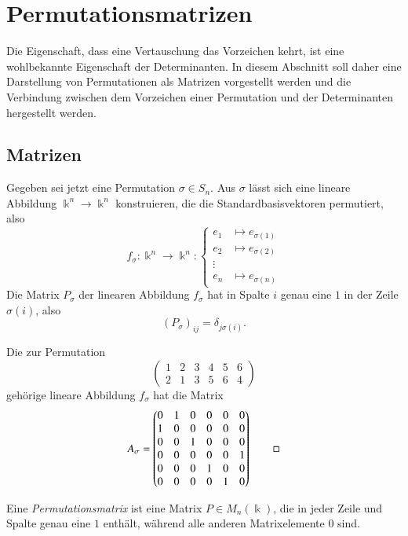 %
%
%
\section{Permutationsmatrizen
\label{buch:section:permutationsmatrizen}}
Die Eigenschaft, dass eine Vertauschung das Vorzeichen kehrt, ist
eine wohlbekannte Eigenschaft der Determinanten.
In diesem Abschnitt soll daher eine Darstellung von Permutationen
als Matrizen vorgestellt werden und die Verbindung zwischen dem
Vorzeichen einer Permutation und der Determinanten hergestellt
werden.
%

\subsection{Matrizen}
Gegeben sei jetzt eine Permutation $\sigma\in S_n$. 
Aus $\sigma$ lässt sich eine lineare Abbildung $\Bbbk^n\to\Bbbk^n$
konstruieren, die die Standardbasisvektoren permutiert, also
\[
f_{\sigma}\colon
\Bbbk^n \to \Bbbk^n
:
\left\{
\begin{aligned}
e_1&\mapsto e_{\sigma(1)} \\
e_2&\mapsto e_{\sigma(2)} \\
\vdots&\\
e_n&\mapsto e_{\sigma(n)}
\end{aligned}
\right.
\]
Die Matrix $P_\sigma$ der linearen Abbildung $f_{\sigma}$ hat in Spalte $i$
genau eine $1$ in der Zeile $\sigma(i)$, also
\[
(P_\sigma)_{i\!j} = \delta_{j\sigma(i)}.
\]

\begin{beispiel}
Die zur Permutation
\[
\begin{pmatrix}
1&2&3&4&5&6\\
2&1&3&5&6&4
\end{pmatrix}
\]
gehörige lineare Abbildung $f_\sigma$ hat die Matrix
\[
A_\sigma
=
\begin{pmatrix}
0&1&0&0&0&0\\
1&0&0&0&0&0\\
0&0&1&0&0&0\\
0&0&0&0&0&1\\
0&0&0&1&0&0\\
0&0&0&0&1&0
\end{pmatrix}
\qedhere
\]
\end{beispiel}

\begin{definition}
\label{buch:permutationen:def:permutationsmatrix}
%
Eine {\em Permutationsmatrix} ist eine Matrix $P\in M_n(\Bbbk)$,
die in jeder Zeile und Spalte genau eine $1$ enthält,
während alle anderen Matrixelemente $0$ sind.
\end{definition}

